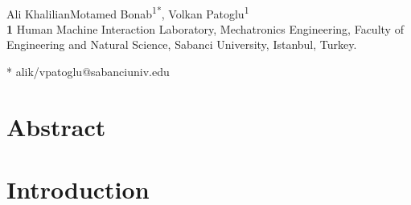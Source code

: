 \documentclass[10pt,letterpaper]{article}
\begin{document}
\vspace*{0.2in}

\begin{flushleft}
{\Large
\textbf{} %
}
\newline
\\
Ali KhalilianMotamed Bonab\textsuperscript{1*},
Volkan Patoglu\textsuperscript{1}
\\
\bigskip
\textbf{1} Human Machine Interaction Laboratory, Mechatronics Engineering, Faculty of Engineering and Natural Science, Sabanci University, Istanbul, Turkey.
\\
\bigskip

* alik/vpatoglu@sabanciuniv.edu

\end{flushleft}
\section*{Abstract}

\section*{\textbf{Introduction}}
\end{document}
